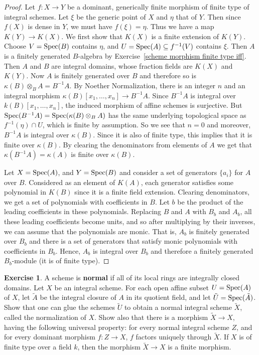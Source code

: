 \documentclass[11pt]{book}
\theoremstyle{definition}
\newtheorem{exercise}{Exercise}[section]
\begin{document}
\begin{proof}
Let $f:X\to Y$ be a dominant, generically finite morphism of finite type of integral schemes. Let $\xi$ be the generic point of $X$ and $\eta$ that of $Y$. Then since $f(X)$ is dense in $Y$, we must have $f(\xi)=\eta$. Thus we have a map $K(Y)\to K(X)$. We first show that $K(X)$ is a finite extension of $K(Y)$. Choose $V=\mathrm{Spec}(B)$ contains $\eta$, and $U=\mathrm{Spec}(A)\subseteq f^{-1}(V)$ contains $\xi$. Then $A$ is a finitely generated $B$-algebra by Exercise~\ref{scheme morphism finite type iff}. Then $A$ and $B$ are integral domains, whose fraction fields are $K(X)$ and $K(Y)$. Now $A$ is finitely generated over $B$ and therefore so is $\kappa(B)\otimes_BA=B^{-1}A$. By Noether Normalization, there is an integer $n$ and an integral morphism $\kappa(B)[x_1,\dots,x_n]\to B^{-1}A$. Since $B^{-1}A$ is integral over $k(B)[x_1,\dots,x_n]$, the induced morphism of affine schemes is surjective. But $\mathrm{Spec}(B^{-1}A)=\mathrm{Spec}(\kappa(B)\otimes_BA)$ has the same underlying topological space as $f^{-1}(\eta)\cap U$, which is finite by assumption. So we see that $n=0$ and moreover, $B^{-1}A$ is integral over $\kappa(B)$. Since it is also of finite type, this implies that it is finite over $\kappa(B)$. By clearing the denominators from elements of $A$ we get that $\kappa(B^{-1}A)=\kappa(A)$ is finite over $\kappa(B)$.\par
Let $X=\mathrm{Spec}(A)$, and $Y=\mathrm{Spec}(B)$ and consider a set of generators $\{a_i\}$ for $A$ over $B$. Considered as an element of $K(A)$, each generator satisfies some polynomial in $K(B)$ since it is a finite field extension. Clearing denominators, we get a set of polynomials with coefficients in $B$. Let $b$ be the product of the leading coefficients in these polynomials. Replacing $B$ and $A$ with $B_b$ and $A_b$, all these leading coefficients become units, and so after multiplying by their inverses, we can assume that the polynomials are monic. That is, $A_b$ is finitely generated over $B_b$ and there is a set of generators that satisfy monic polynomials with coefficients in $B_b$. Hence, $A_b$ is integral over $B_b$ and therefore a finitely generated $B_b$-module (it is of finite type).
\end{proof}
\begin{exercise}
A scheme is \textbf{normal} if all of its local rings are integrally closed domains. Let $X$ be an integral scheme. For each open affine subset $U=\mathrm{Spec}(A)$ of $X$, let $\tilde{A}$ be the integral closure of $A$ in its quotient field, and let $\tilde{U}=\mathrm{Spec}(\tilde{A})$. Show that one can glue the schemes $\tilde{U}$ to obtain a normal integral scheme $\tilde{X}$, called the normalization of $X$. Show also that there is a morphism $\tilde{X}\to X$, having the following universal property: for every normal integral scheme $Z$, and for every dominant morphism $f:Z\to X$, $f$ factors uniquely through $\tilde{X}$. If $X$ is of finite type over a field $k$, then the morphism $\tilde{X}\to X$ is a finite morphism.
\end{exercise}
\end{document}
